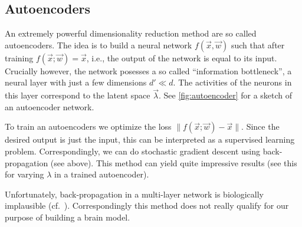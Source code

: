 \documentclass[10pt,letterpaper,oneside]{article}
\begin{document}
\subsection{Autoencoders}

An extremely powerful dimensionality reduction method are so called autoencoders. The idea is to build a neural network $f(\vec x, \vec w)$ such that after training $f(\vec x; \vec w) = \vec x$, i.e., the output of the network is equal to its input. Crucially however, the network posesses a so called \enquote{information bottleneck}, a neural layer with just a few dimensions $d' \ll d$. The activities of the neurons in this layer correspond to the latent space $\vec \lambda$. See \cref{fig:autoencoder} for a sketch of an autoencoder network.

To train an autoencoders we optimize the loss $\| f(\vec x; \vec w) - \vec x \|$. Since the desired output is just the input, this can be interpreted as a supervised learning problem. Correspondingly, we can do stochastic gradient descent using back-propagation (see above). This method can yield quite impressive results (see this  for varying $\lambda$ in a trained autoencoder).

Unfortunately, back-propagation in a multi-layer network is biologically implausible (cf.~\cite{hunsberger2018spiking}). Correspondingly this method does not really qualify for our purpose of building a brain model.
\end{document}
